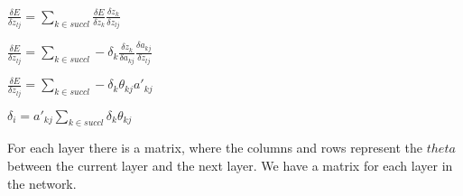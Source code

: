 \(\frac{\delta E}{\delta z_{lj}}=\sum_{k\in succ{l}}\frac{\delta E}{\delta z_{k}}\frac{\delta z_{k}}{\delta z_{lj}}\)

\(\frac{\delta E}{\delta z_{lj}}=\sum_{k\in succ{l}}-\delta_{k}\frac{\delta z_{k}}{\delta a_{kj}}\frac{\delta a_{kj}}{\delta z_{lj}}\)

\(\frac{\delta E}{\delta z_{lj}}=\sum_{k\in succ{l}}-\delta_{k}\theta_{kj}a'_{kj}\)

\(\delta_i=a'_{kj}\sum_{k\in succ{l}}\delta_{k}\theta_{kj}\)

For each layer there is a matrix, where the columns and rows represent the \(theta \) between the current layer and the next layer. We have a matrix for each layer in the network.

